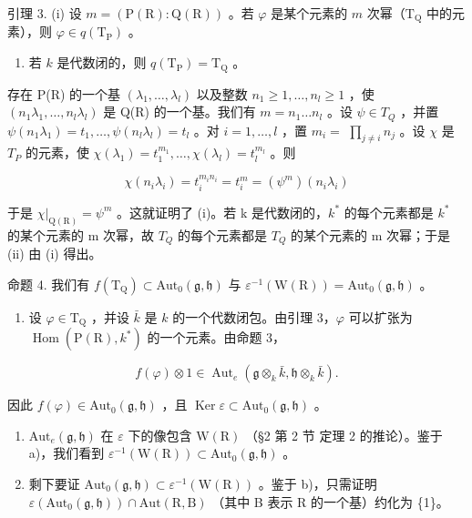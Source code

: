 引理 3. (i) 设 \(m = (\mathrm{P}(\mathrm{R}) : \mathrm{Q}(\mathrm{R}))\) 。若 \(\varphi\) 是某个元素的 \(m\) 次幂（\(\mathrm{T}_{\mathrm{Q}}\) 中的元素），则 \(\varphi \in q(\mathrm{T}_{\mathrm{P}})\) 。

\begin{enumerate}
\def\labelenumi{(\roman{enumi})}
\setcounter{enumi}{1}
\tightlist
\item
  若 \(k\) 是代数闭的，则 \(q(\mathrm{T}_{\mathrm{P}}) = \mathrm{T}_{\mathrm{Q}}\) 。
\end{enumerate}

存在 P(R) 的一个基 \((\lambda_{1},\ldots,\lambda_{l})\) 以及整数 \(n_{1}\geq1,\ldots,n_{l}\geq1\) ，使 \((n_{1}\lambda_{1},\ldots,n_{l}\lambda_{l})\) 是 Q(R) 的一个基。我们有 \(m=n_{1}\ldots n_{l}\) 。设 \(\psi\in T_{Q}\) ，并置 \(\psi(n_{1}\lambda_{1})=t_{1},\ldots,\psi(n_{l}\lambda_{l})=t_{l}\) 。对 \(i=1,\ldots,l\) ，置 \(m_{i}=\) \(\prod_{j \neq i} n_j\) 。设 \(\chi\) 是 \(T_P\) 的元素，使 \(\chi(\lambda_1) = t_1^{m_1}, \ldots, \chi(\lambda_l) = t_l^{m_l}\) 。则

\[
\chi (n _ {i} \lambda_ {i}) = t _ {i} ^ {m _ {i} n _ {i}} = t _ {i} ^ {m} = (\psi^ {m}) (n _ {i} \lambda_ {i})
\]

于是 \(\chi|_{\mathrm{Q}(\mathrm{R})}=\psi^{m}\) 。这就证明了 (i)。若 k 是代数闭的，\(k^{*}\) 的每个元素都是 \(k^{*}\) 的某个元素的 m 次幂，故 \(T_{Q}\) 的每个元素都是 \(T_{Q}\) 的某个元素的 m 次幂；于是 (ii) 由 (i) 得出。

命题 4. 我们有 \(f(\mathrm{T}_{\mathrm{Q}}) \subset \mathrm{Aut}_0(\mathfrak{g}, \mathfrak{h})\) 与 \(\varepsilon^{-1}(\mathrm{W}(\mathrm{R})) = \mathrm{Aut}_0(\mathfrak{g}, \mathfrak{h})\) 。

\begin{enumerate}
\def\labelenumi{\alph{enumi})}
\tightlist
\item
  设 \(\varphi \in \mathrm{T}_{\mathrm{Q}}\) ，并设 \(\bar{k}\) 是 \(k\) 的一个代数闭包。由引理 3，\(\varphi\) 可以扩张为 \(\operatorname{Hom}(\mathrm{P}(\mathrm{R}), k^*)\) 的一个元素。由命题 3，
\end{enumerate}

\[
f (\varphi) \otimes 1 \in \operatorname{Aut} _ {e} (\mathfrak {g} \otimes_ {k} \bar {k}, \mathfrak {h} \otimes_ {k} \bar {k}).
\]

因此 \(f(\varphi) \in \mathrm{Aut}_0(\mathfrak{g},\mathfrak{h})\) ，且 \(\operatorname{Ker} \varepsilon \subset \mathrm{Aut}_0(\mathfrak{g},\mathfrak{h})\) 。

\begin{enumerate}
\def\labelenumi{\alph{enumi})}
\setcounter{enumi}{1}
\item
  \(\mathrm{Aut}_e(\mathfrak{g},\mathfrak{h})\) 在 \(\varepsilon\) 下的像包含 \(\mathrm{W(R)}\) （§2 第 2 节 定理 2 的推论）。鉴于 a)，我们看到 \(\varepsilon^{-1}(\mathrm{W(R)})\subset \mathrm{Aut}_0(\mathfrak{g},\mathfrak{h})\) 。
\item
  剩下要证 \(\mathrm{Aut}_0(\mathfrak{g},\mathfrak{h})\subset \varepsilon^{-1}(\mathrm{W}(\mathrm{R}))\) 。鉴于 b)，只需证明 \(\varepsilon (\mathrm{Aut}_0(\mathfrak{g},\mathfrak{h}))\cap \mathrm{Aut}(\mathrm{R},\mathrm{B})\) （其中 B 表示 R 的一个基）约化为 \{1\}。
\end{enumerate}

